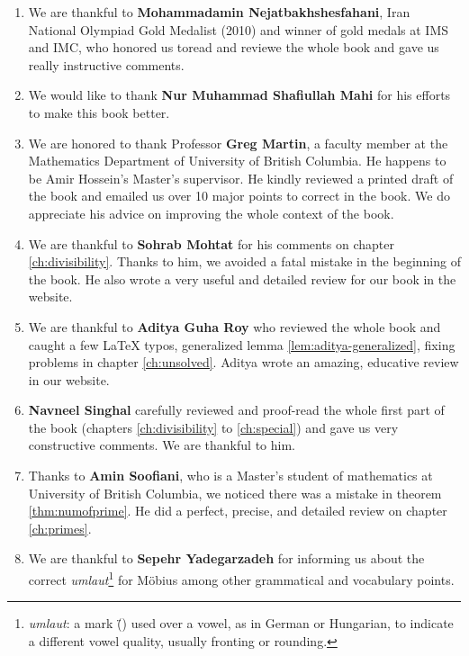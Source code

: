 \documentclass[leqno, 12pt]{book}
\begin{document}
\begin{enumerate}
		\item We are thankful to \textbf{Mohammadamin Nejatbakhshesfahani}, Iran National Olympiad Gold Medalist (2010) and winner of gold medals at IMS and IMC, who honored us toread and reviewe the whole book and gave us really instructive comments.
				
		\item We would like to thank \textbf{Nur Muhammad Shafiullah Mahi} for his efforts to make this book better.
		
		\item We are honored to thank Professor \textbf{Greg Martin}, a faculty member at the Mathematics Department of University of British Columbia. He happens to be Amir Hossein's Master's supervisor. He kindly reviewed a printed draft of the book and emailed us over 10 major points to correct in the book. We do appreciate his advice on improving the whole context of the book.
		
		\item We are thankful to \textbf{Sohrab Mohtat} for his comments on chapter \ref{ch:divisibility}. Thanks to him, we avoided a fatal mistake in the beginning of the book. He also wrote a very useful and detailed review for our book in the website.


		\item We are thankful to \textbf{Aditya Guha Roy} who reviewed the whole book and caught a few LaTeX typos, generalized lemma \eqref{lem:aditya-generalized}, fixing problems in chapter \ref{ch:unsolved}. Aditya wrote an amazing, educative review in our website.
		\item \textbf{Navneel Singhal} carefully reviewed and proof-read the whole first part of the book (chapters \ref{ch:divisibility} to \ref{ch:special}) and gave us very constructive comments. We are thankful to him.
				
		\item Thanks to \textbf{Amin Soofiani}, who is a Master's student of mathematics at University of British Columbia, we noticed there was a mistake in theorem \eqref{thm:numofprime}. He did a perfect, precise, and detailed review on chapter \ref{ch:primes}. 
		




		
		\item We are thankful to \textbf{Sepehr Yadegarzadeh} for informing us about the correct \textit{umlaut}\footnote{\textit{umlaut}: a mark (\"{}) used over a vowel, as in German or Hungarian, to indicate a different vowel quality, usually fronting or rounding.} for M\"{o}bius among other grammatical and vocabulary points.
	\end{enumerate}
	
\end{document}
